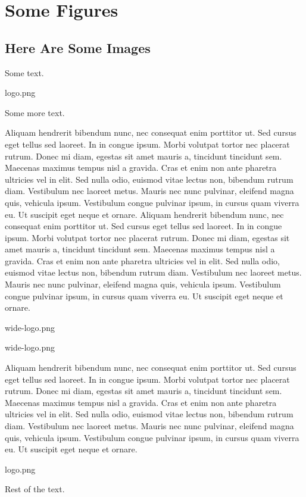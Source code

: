 \chapter{Some Figures}
\section{Here Are Some Images}

Some text.

    {logo.png}

Some more text.

Aliquam hendrerit bibendum nunc, nec consequat enim porttitor ut. Sed cursus eget tellus sed laoreet. In in congue ipsum. Morbi volutpat tortor nec placerat rutrum. Donec mi diam, egestas sit amet mauris a, tincidunt tincidunt sem. Maecenas maximus tempus nisl a gravida. Cras et enim non ante pharetra ultricies vel in elit. Sed nulla odio, euismod vitae lectus non, bibendum rutrum diam. Vestibulum nec laoreet metus. Mauris nec nunc pulvinar, eleifend magna quis, vehicula ipsum. Vestibulum congue pulvinar ipsum, in cursus quam viverra eu. Ut suscipit eget neque et ornare. Aliquam hendrerit bibendum nunc, nec consequat enim porttitor ut. Sed cursus eget tellus sed laoreet. In in congue ipsum. Morbi volutpat tortor nec placerat rutrum. Donec mi diam, egestas sit amet mauris a, tincidunt tincidunt sem. Maecenas maximus tempus nisl a gravida. Cras et enim non ante pharetra ultricies vel in elit. Sed nulla odio, euismod vitae lectus non, bibendum rutrum diam. Vestibulum nec laoreet metus. Mauris nec nunc pulvinar, eleifend magna quis, vehicula ipsum. Vestibulum congue pulvinar ipsum, in cursus quam viverra eu. Ut suscipit eget neque et ornare.

	{wide-logo.png}

	{wide-logo.png}

Aliquam hendrerit bibendum nunc, nec consequat enim porttitor ut. Sed cursus eget tellus sed laoreet. In in congue ipsum. Morbi volutpat tortor nec placerat rutrum. Donec mi diam, egestas sit amet mauris a, tincidunt tincidunt sem. Maecenas maximus tempus nisl a gravida. Cras et enim non ante pharetra ultricies vel in elit. Sed nulla odio, euismod vitae lectus non, bibendum rutrum diam. Vestibulum nec laoreet metus. Mauris nec nunc pulvinar, eleifend magna quis, vehicula ipsum. Vestibulum congue pulvinar ipsum, in cursus quam viverra eu. Ut suscipit eget neque et ornare.

    {logo.png}

Rest of the text.
